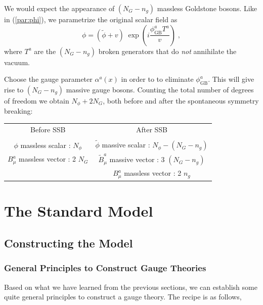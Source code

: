 \documentclass[12pt]{report}
\def\text#1{{\scriptstyle\mathrm{#1}}}
\begin{document}
We would expect the appearance of $(N_G - n_g)$ massless Goldstone bosons.
Like in (\ref{par:phi}), we parametrize the original scalar field as
\[
\phi = (\tilde{\phi} + v) \; 
\exp\left(i \frac{\phi_{\text{GB}}^a T^a}{v} \right) \; ,
\]
where $T^a$ are the $(N_G - n_g)$ broken generators that do {\it not}
annihilate the vacuum.

Choose the gauge parameter $\alpha^a(x)$ in order to to eliminate
$\phi_{\text{GB}}^a$. This will give rise to  $(N_G - n_g)$ massive
gauge bosons. Counting the total number of degrees of freedom we
obtain $N_\phi + 2 N_G$, both before and after the spontaneous
symmetry breaking: 

\vskip 1.2cm
\begin{center}
\begin{tabular}{cc}
Before SSB & After SSB \\
& \\
$\phi$ massless scalar : $N_\phi$  & 
$\tilde{\phi}$ massive scalar : $N_\phi - (N_G - n_g)$   \\
$B^a_\mu$ massless vector : 2 $N_G$  & 
$\tilde{B}^a_\mu$ massive vector : 3 $(N_G - n_g)$ \\
 &  $B^a_\mu$ massless vector : 2 $n_g$ 
\end{tabular}
\end{center}

\newpage
\chapter{The Standard Model} \label{sm}

\section{Constructing the Model} 

\subsection{General Principles to Construct Gauge Theories}
\indent

Based on what we have learned from the previous sections, we can
establish some quite general principles to construct a gauge theory.
The recipe is as follows,
\end{document}
